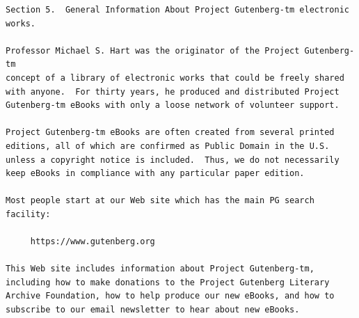 \documentclass{book}
\begin{document}
\begin{verbatim}
Section 5.  General Information About Project Gutenberg-tm electronic
works.

Professor Michael S. Hart was the originator of the Project Gutenberg-tm
concept of a library of electronic works that could be freely shared
with anyone.  For thirty years, he produced and distributed Project
Gutenberg-tm eBooks with only a loose network of volunteer support.

Project Gutenberg-tm eBooks are often created from several printed
editions, all of which are confirmed as Public Domain in the U.S.
unless a copyright notice is included.  Thus, we do not necessarily
keep eBooks in compliance with any particular paper edition.

Most people start at our Web site which has the main PG search facility:

     https://www.gutenberg.org

This Web site includes information about Project Gutenberg-tm,
including how to make donations to the Project Gutenberg Literary
Archive Foundation, how to help produce our new eBooks, and how to
subscribe to our email newsletter to hear about new eBooks.



\end{verbatim}
\normalsize
\end{document}
